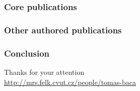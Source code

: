 \documentclass[aspectratio=169]{beamer}
\begin{document}



\DeclareCiteCommand{\fullcite}
{}
{%
  \usedriver
  {%
  }
{}}
{\multicitedelim}
{}

\begin{frame}
  \frametitle{Core publications}
  \tiny{
    \printbibliography[keyword={mine},keyword={phd_related},keyword={core},heading=none,title={}]
  }
\end{frame}

\begin{frame}[allowframebreaks]
  \frametitle{Other authored publications}
  \tiny{
    \printbibliography[keyword={mine},notkeyword={core},heading=none,title={}]
  }
\end{frame}



\begin{frame}
  \frametitle{Conclusion}

  \begin{center}
    \huge Thanks for your attention\\
    \vspace{1em}
    \large \url{http://mrs.felk.cvut.cz/people/tomas-baca}
  \end{center}

\end{frame}

\end{document}
